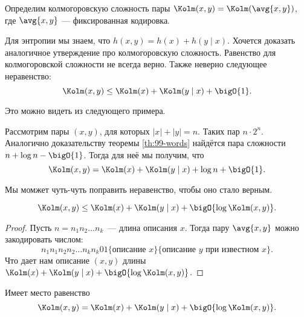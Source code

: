 \begin{definition}
    Определим колмогоровскую сложность пары $\Kolm(x, y) = \Kolm(\avg{x, y})$, где $\avg{x, y}$ ---
    фиксированная кодировка.
\end{definition}

Для энтропии мы знаем, что $h(x, y) = h(x) + h(y \mid x)$. Хочется доказать аналогичное утверждение про
колмогоровскую сложность. Равенство для колмогоровской сложности не всегда верно. Также неверно следующее
неравенство:  
$$
    \Kolm(x, y) \le \Kolm(x) + \Kolm(y \mid x) + \bigO{1}.
$$
    
Это можно видеть из следующего примера.
\begin{example}
    Рассмотрим пары $(x, y)$, для которых $|x| + |y| = n$. Таких пар $n \cdot 2^n$. Аналогично
    доказательству теоремы \ref{th:99-words} найдётся пара сложности $n + \log n - \bigO{1}$. Тогда для
    неё мы получим, что  
    $$
        \Kolm(x, y) = \Kolm(x) + \Kolm(y \mid x) + \log n + \bigO{1}.
    $$
\end{example}

Мы момжет чуть-чуть поправить неравенство, чтобы оно стало верным.
\begin{theorem}
    $$
        \Kolm(x, y) \le \Kolm(x) + \Kolm(y \mid x) + \bigO{\log \Kolm(x, y)}.
    $$
\end{theorem}

\begin{proof}
    Пусть $n = n_1n_2\ldots n_k$~--- длина описания $x$. Тогда пару $\avg{x, y}$ можно закодировать
    числом:
    $$
        n_1n_1n_2n_2 \ldots n_kn_k01\{\text{описание } x\}\{\text{описание } y \text{ при известном $x$}\}.
    $$
    Что дает нам описание $(x, y)$ длины $\Kolm(x) + \Kolm(y \mid x) + \bigO{\log \Kolm(x, y)}$.
\end{proof}

\begin{theorem}
    Имеет место равенство 
    $$
        \Kolm(x, y) = \Kolm(x) + \Kolm(y \mid x) + \bigO{\log \Kolm(x, y)}.
    $$
\end{theorem}

